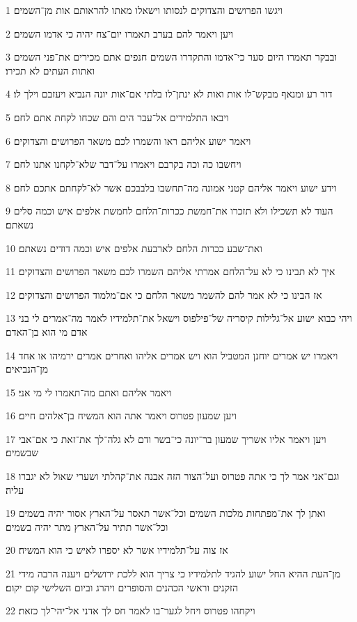 \par 1 ויגשו הפרושים והצדוקים לנסותו וישאלו מאתו להראותם אות מן־השמים׃
\par 2 ויען ויאמר להם בערב תאמרו יום־צח יהיה כי אדמו השמים׃
\par 3 ובבקר תאמרו היום סער כי־אדמו והתקדרו השמים חנפים אתם מכירים את־פני השמים ואתות העתים לא תכירו׃
\par 4 דור רע ומנאף מבקש־לו אות ואות לא ינתן־לו בלתי אם־אות יונה הנביא ויעזבם וילך לו׃
\par 5 ויבאו התלמידים אל־עבר הים והם שכחו לקחת אתם לחם׃
\par 6 ויאמר ישוע אליהם ראו והשמרו לכם משאר הפרושים והצדוקים׃
\par 7 ויחשבו כה וכה בקרבם ויאמרו על־דבר שלא־לקחנו אתנו לחם׃
\par 8 וידע ישוע ויאמר אליהם קטני אמונה מה־תחשבו בלבבכם אשר לא־לקחתם אתכם לחם׃
\par 9 העוד לא תשכילו ולא תזכרו את־חמשת ככרות־הלחם לחמשת אלפים איש וכמה סלים נשאתם׃
\par 10 ואת־שבע ככרות הלחם לארבעת אלפים איש וכמה דודים נשאתם׃
\par 11 איך לא תבינו כי לא על־הלחם אמרתי אליהם השמרו לכם משאר הפרושים והצדוקים׃
\par 12 אז הבינו כי לא אמר להם להשמר משאר הלחם כי אם־מלמוד הפרושים והצדוקים׃
\par 13 ויהי כבוא ישוע אל־גלילות קיסריה של־פילפוס וישאל את־תלמידיו לאמר מה־אמרים לי בני אדם מי הוא בן־האדם׃
\par 14 ויאמרו יש אמרים יוחנן המטביל הוא ויש אמרים אליהו ואחרים אמרים ירמיהו או אחד מן־הנביאים׃
\par 15 ויאמר אליהם ואתם מה־תאמרו לי מי אני׃
\par 16 ויען שמעון פטרוס ויאמר אתה הוא המשיח בן־אלהים חיים׃
\par 17 ויען ויאמר אליו אשריך שמעון בר־יונה כי־בשר ודם לא גלה־לך את־זאת כי אם־אבי שבשמים׃
\par 18 וגם־אני אמר לך כי אתה פטרוס ועל־הצור הזה אבנה את־קהלתי ושערי שאול לא יגברו עליה׃
\par 19 ואתן לך את־מפתחות מלכות השמים וכל־אשר תאסר על־הארץ אסור יהיה בשמים וכל־אשר תתיר על־הארץ מתר יהיה בשמים׃
\par 20 אז צוה על־תלמידיו אשר לא יספרו לאיש כי הוא המשיח׃
\par 21 מן־העת ההיא החל ישוע להגיד לתלמידיו כי צריך הוא ללכת ירושלים ויענה הרבה מידי הזקנים וראשי הכהנים והסופרים ויהרג וביום השלישי קום יקום׃
\par 22 ויקחהו פטרוס ויחל לגער־בו לאמר חס לך אדני אל־יהי־לך כזאת׃
